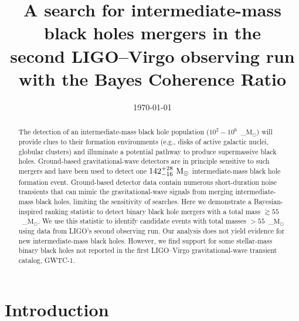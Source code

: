 \documentclass[%
 nofootinbib,
 amsmath,amssymb,
 aps,
 twocolumn,
 superscriptaddress
]{revtex4-2}
\newcommand{\mathcmd}[1]{{\sc \relax\ifmmode#1\else $#1$\fi}\xspace}
\newcommand{\msun}{\mathcmd{\text{M}_\odot}}
\begin{document}
\title{A search for intermediate-mass black holes mergers in the \\second LIGO--Virgo observing run with the Bayes Coherence Ratio}




\date{\today}


\begin{abstract}
The detection of an intermediate-mass black hole population ($10^2-10^6$~\msun) will provide clues to their formation environments (e.g., disks of active galactic nuclei, globular clusters) and illuminate a potential pathway to produce supermassive black holes. Ground-based gravitational-wave detectors are in principle sensitive to such mergers and have been used to detect one $142^{+28}_{-16}\ \msun$ intermediate-mass black hole formation event. Ground-based detector data contain numerous short-duration noise transients that can mimic the gravitational-wave signals from merging intermediate-mass black holes, limiting the sensitivity of searches. Here we demonstrate a Bayesian-inspired ranking statistic to detect binary black hole mergers with a total mass $\gtrsim55$~\msun. We use this statistic to identify candidate events with total masses $>55$~\msun using data from LIGO's second observing run. Our analysis does not yield evidence for new intermediate-mass black holes. However, we find support for some stellar-mass binary black holes not reported in the first LIGO--Virgo gravitational-wave transient catalog, GWTC-1.
\end{abstract}



\maketitle

\section{Introduction}
\end{document}
